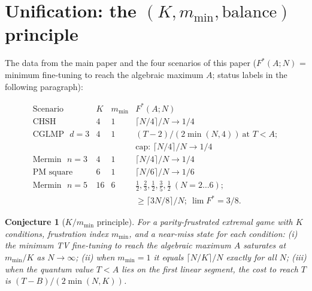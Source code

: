 \documentclass[aps,pra,reprint,superscriptaddress,floatfix]{revtex4-2}
\newtheorem{conjecture}{Conjecture}
\begin{document}
\section{Unification: the $(K,m_{\min},\text{balance})$ principle}
\label{sec:unify}

The data from the main paper \cite{mainpaper2026} and the four scenarios
of this paper ($F^{*}(A;N)$ = minimum fine-tuning to reach the algebraic
maximum $A$; status labels in the following paragraph):

\small
\begin{equation*}
\begin{array}{l|c|c|l}
\text{Scenario} & K & m_{\min} & F^{*}(A;N)\\
\hline
\text{{CHSH}} & 4 & 1 & \lceil N/4\rceil/N\to 1/4\\
\text{{CGLMP} $d=3$} & 4 & 1 & (T-2)/(2\min(N,4))\ \text{at }T<A;\\
 & & & \text{cap: }\lceil N/4\rceil/N\to 1/4\\
\text{{Mermin} $n=3$} & 4 & 1 & \lceil N/4\rceil/N\to 1/4\\
\text{PM square} & 6 & 1 & \lceil N/6\rceil/N\to 1/6\\
\text{{Mermin} $n=5$} & 16 & 6 & \tfrac12,\tfrac23,\tfrac12,\tfrac35,\tfrac12\ (N\!=\!2\dots 6);\\
 & & & \ge\lceil 3N/8\rceil/N;\ \lim F^{*}=3/8.
\end{array}
\end{equation*}
\normalsize

\begin{conjecture}[$K/m_{\min}$ principle]
\label{conj:kmm}
For a parity-frustrated extremal game with $K$ conditions, frustration
index $m_{\min}$, and a near-miss state for each condition: (i) the
minimum TV fine-tuning to reach the algebraic maximum $A$
\emph{saturates at $m_{\min}/K$} as $N\to\infty$; (ii) when $m_{\min}=1$
it equals $\lceil N/K\rceil/N$ exactly for all $N$; (iii) when the
quantum value $T<A$ lies on the first linear segment, the cost to reach
$T$ is $(T-B)/(2\min(N,K))$.
\end{conjecture}
\end{document}
